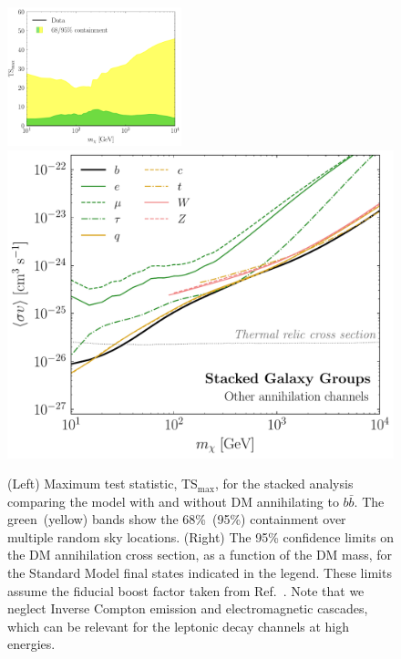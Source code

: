 \begin{figure}[t]
  \centering
   \includegraphics[width=0.45\textwidth]{ch-clusters/plots/global_maxts.pdf}
  \includegraphics[width=.45\textwidth]{ch-clusters/plots/other_annh.pdf}
  \caption{(Left) Maximum test statistic, TS$_\text{max}$, for the stacked analysis comparing the model with and without DM annihilating to $b \bar b$.  The green~(yellow) bands show the 68\%~(95\%) containment over multiple random sky locations.  (Right) The 95\% confidence limits on the DM annihilation cross section, as a function of the DM mass, for the Standard Model final states indicated in the legend.  These limits assume the fiducial boost factor taken from Ref.~\cite{Bartels:2015uba}.  Note that we neglect Inverse Compton emission and electromagnetic cascades, which can be relevant for the leptonic decay channels at high energies.}
  \label{fig:other_lims}
\end{figure}

